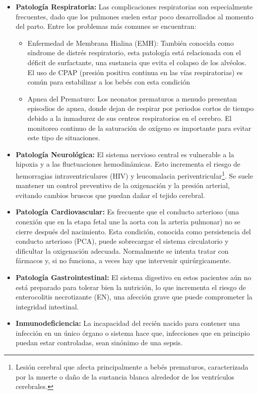 \begin{itemize}
    \item \textbf{Patología Respiratoria:}
    Las complicaciones respiratorias son especialmente frecuentes, dado que los pulmones suelen estar poco desarrollados al momento del parto. Entre los problemas más comunes se encuentran:
    \begin{itemize}
        \item Enfermedad de Membrana Hialina (EMH): También conocida como síndrome de distrés respiratorio, esta patología está relacionada con el déficit de surfactante, una sustancia que evita el colapso de los alvéolos. El uso de CPAP (presión positiva continua en las vías respiratorias) es común para estabilizar a los bebés con esta condición
        \item Apnea del Prematuro: Los neonatos prematuros a menudo presentan episodios de apnea, donde dejan de respirar por periodos cortos de tiempo debido a la inmadurez de sus centros respiratorios en el cerebro. El monitoreo continuo de la saturación de oxígeno es importante para evitar este tipo de situaciones.
    \end{itemize}
    \item \textbf{Patología Neurológica: }El sistema nervioso central es vulnerable a la hipoxia y a las fluctuaciones hemodinámicas. Esto incrementa el riesgo de hemorragias intraventriculares (HIV) y leucomalacia periventricular\footnote{Lesión cerebral que afecta principalmente a bebés prematuros, caracterizada por la muerte o daño de la sustancia blanca alrededor de los ventrículos cerebrales.}. Se suele mantener un control preventivo de la oxigenación y la presión arterial, evitando cambios bruscos que puedan dañar el tejido cerebral.
    \item \textbf{Patología Cardiovascular: }Es frecuente que el conducto arterioso (una conexión que en la etapa fetal une la aorta con la arteria pulmonar) no se cierre después del nacimiento. Esta condición, conocida como persistencia del conducto arterioso (PCA), puede sobrecargar el sistema circulatorio y dificultar la oxigenación adecuada. Normalmente se intenta tratar con fármacos y, si no funciona, a veces hay que intervenir quirúrgicamente.
    \item \textbf{Patología Gastrointestinal:} El sistema digestivo en estos pacientes aún no está preparado para tolerar bien la nutrición, lo que incrementa el riesgo de enterocolitis necrotizante (EN), una afección grave que puede comprometer la integridad intestinal.
    \item \textbf{Inmunodeficiencia: }La incapacidad del recién nacido para contener una infección en un único órgano o sistema hace que, infecciones que en principio puedan estar controladas, sean sinónimo de una sepsis. 
\end{itemize}

